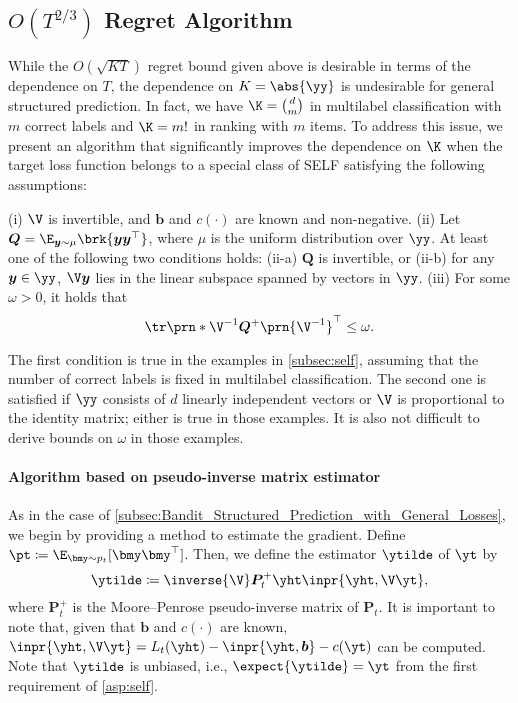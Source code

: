 \subsection{$O(T^{2/3})$ Regret Algorithm}
\label{subsec:Bandit_Structured_Prediction_with_SELF}
While the $O(\sqrt{KT})$ regret bound given above is desirable in terms of the dependence on $T$, the dependence on $K = \abs{\yy}$ is undesirable for general structured prediction.  
In fact, we have $\K=\binom{d}{m}$ in multilabel classification with $m$ correct labels and $\K=m!$ in ranking with $m$ items.  
To address this issue, we present an algorithm that significantly improves the dependence on $\K$ when the target loss function belongs to a special class of SELF satisfying the following assumptions:
\begin{assumption}\label{asp:self}
(i) $\V$ is invertible, and $\bm{b}$ and $c(\cdot)$ are known and non-negative.
(ii) Let $\bm{Q} = \E_{\bm{y} \sim \mu} \brk{ \bm{y} \bm{y}^\top }$, where $\mu$ is the uniform distribution over $\yy$. At least one of the following two conditions holds: 
(ii-a) $\bm{Q}$ is invertible, or 
(ii-b) for any $\bm{y} \in \yy$, $\V \bm{y}$ lies in the linear subspace spanned by vectors in $\yy$. 
(iii) For some $\omega > 0$, it holds that
\begin{equation}\label{eq:def_omega}
    \tr \prn*{ \V^{-1} \bm{Q}^+ \prn{\V^{-1}}^\top } \leq \omega.
    \nonumber
\end{equation} 
\end{assumption}
The first condition is true in the examples in \cref{subsec:self}, assuming that the number of correct labels is fixed in multilabel classification.
The second one is satisfied if $\yy$ consists of $d$ linearly independent vectors or $\V$ is proportional to the identity matrix; either is true in those examples. 
It is also not difficult to derive bounds on $\omega$ in those examples.

\paragraph{Algorithm based on pseudo-inverse matrix estimator}
As in the case of \cref{subsec:Bandit_Structured_Prediction_with_General_Losses}, we begin by providing a method to estimate the gradient.  
Define $\pt \coloneqq\E_{\bmy\sim p_t}[\bmy\bmy^\top]$.
Then, we define the estimator $\ytilde$ of $\yt$ by
\[
    \ytilde\coloneqq\inverse{\V}\bm{P}_t^+\yht\inpr{\yht,\V\yt},
\]
where $\bm{P}_t^+$ is the Moore--Penrose pseudo-inverse matrix of $\bm{P}_t$.
It is important to note that, given that $\bm{b}$ and $c(\cdot)$ are known,  
$
\inpr{\yht,\V\yt}=L_t(\yht)-\inpr{\yht,\bm{b}}-c(\yt)
$
can be computed.  
Note that $\ytilde$ is unbiased, i.e.,
$
\expect{\ytilde}=\yt
$
from the first requirement of \cref{asp:self}.


